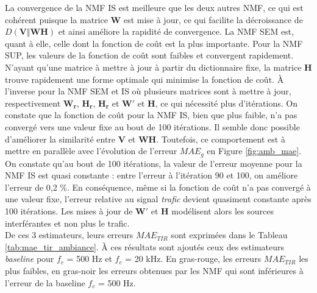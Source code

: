 La convergence de la NMF IS est meilleure que les deux autres NMF, ce qui est cohérent puisque la matrice $\mathbf{W}$ est mise à jour, ce qui facilite la décroissance de $D(\mathbf{V}\Vert \mathbf{WH})$ et ainsi améliore la rapidité de convergence. La NMF SEM est, quant à elle, celle dont la fonction de coût est la plus importante. Pour la NMF SUP, les valeurs de la fonction de coût sont faibles et convergent rapidement. N'ayant qu'une matrice à mettre à jour à partir du dictionnaire fixe, la matrice $\mathbf{H}$ trouve rapidement une forme optimale qui minimise la fonction de coût. À l'inverse pour la NMF SEM et IS où plusieurs matrices sont à mettre à jour, respectivement $\mathbf{W_r}$, $\mathbf{H_r}$, $\mathbf{H_r}$ et $\mathbf{W'}$ et $\mathbf{H}$, ce qui nécessité plus d'itérations. On constate que la fonction de coût pour la NMF IS, bien que plus faible, n'a pas convergé vers une valeur fixe au bout de 100 itérations. Il semble donc possible d'améliorer la similarité entre $\mathbf{V}$ et $\mathbf{WH}$. Toutefois, ce comportement est à mettre en parallèle avec l'évolution de l'erreur $MAE_g$ en Figure \ref{fig:amb_mae}. On constate qu'au bout de 100 itérations, la valeur de l'erreur moyenne pour la NMF IS est quasi constante : entre l'erreur à l'itération 90 et 100, on améliore l'erreur de 0,2 $\%$. En conséquence, même si la fonction de coût n'a pas convergé à une valeur fixe, l'erreur relative au signal \textit{trafic} devient quasiment constante après 100 itérations. Les mises à jour de $\mathbf{W'}$ et $\mathbf{H}$ modélisent alors les sources interférantes et non plus le trafic.\\

De ces 3 estimateurs, leurs erreurs $MAE_{TIR}$ sont exprimées dans le Tableau \ref{tab:mae_tir_ambiance}. À ces résultats sont ajoutés ceux des estimateurs \textit{baseline} pour $f_c$ = 500 Hz et $f_c$ = 20 kHz. En gras-rouge, les erreurs $MAE_{TIR}$ les plus faibles, en gras-noir les erreurs obtenues par les NMF qui sont inférieures à l'erreur de la baseline $f_c$ = 500 Hz.\\

